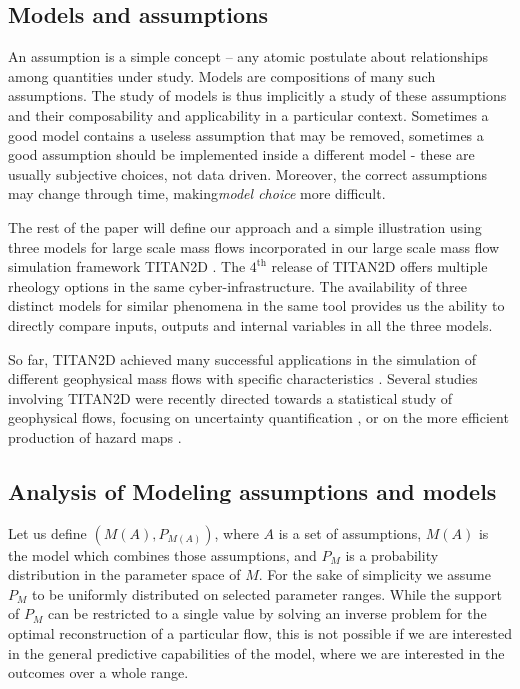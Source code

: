 \documentclass{article}
\begin{document}
\subsection{Models and assumptions}
An assumption is a simple concept -- any atomic postulate about relationships among quantities under study. Models are compositions of many such assumptions. The study of models is thus implicitly a study of these assumptions and their composability and applicability in a particular context. Sometimes a good model contains a useless assumption that may be removed, sometimes a good assumption should be implemented inside a different model - these are usually subjective choices, not data driven. Moreover, the correct assumptions may change through time, making{\em model choice} more difficult.

The rest of the paper will define our approach and a simple illustration using three models for large scale mass flows incorporated in our large scale mass flow simulation framework  TITAN2D \citep{Patra2005,Patra2006, Yu2009, Aghakhani2016}. The $\mathrm{4^{\mathrm{th}}}$ release of TITAN2D offers multiple rheology options in the same cyber-infrastructure. The availability of three distinct models for similar phenomena in the same tool provides us the  ability to directly compare inputs, outputs and internal variables in all the three models.

So far, TITAN2D achieved many successful applications in the simulation of different geophysical mass flows with specific characteristics \citep{Sheridan2005, Rupp2006, Norini2008, Charbonnier2009, Procter2010, Sheridan2010, Sulpizio2010, Capra2011}. Several studies involving TITAN2D were recently directed towards a statistical study of geophysical flows, focusing on uncertainty quantification \citep{Dalbey2008, Dalbey2009, Stefanescu2012b, Stefanescu2012a}, or on the more efficient production of hazard maps \citep{Bayarri2009, Spiller2014,Bayarri2015, Ogburn2016}.

\subsection{Analysis of Modeling assumptions and models }
Let us define $\left(M(A), P_{M(A)}\right)$, where $A$ is a set of assumptions, $M(A)$ is the model which combines those assumptions, and $P_M$ is a probability distribution in the parameter space of $M$. For the sake of simplicity we assume $P_M$ to be uniformly distributed on selected parameter ranges. While the support of $P_M$ can be restricted to a single value by solving an inverse problem for the optimal reconstruction of a particular flow, this is not possible if we are interested in the general predictive capabilities of the model, where we are interested in the outcomes over a whole range.
\end{document}

